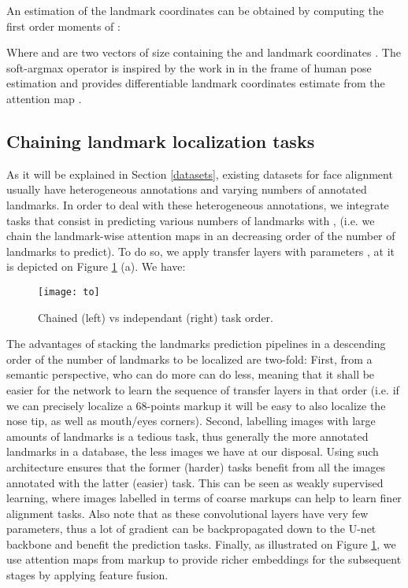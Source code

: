 \documentclass[10pt,twocolumn,letterpaper]{article}
\begin{document}
An estimation  of the landmark coordinates can be obtained by computing the first order moments of :



Where  and  are two vectors of size  containing the  and  landmark coordinates . The soft-argmax operator is inspired by the work in \cite{luvizon2017human} in the frame of human pose estimation and provides differentiable landmark coordinates estimate from the attention map .

\subsection{Chaining landmark localization tasks}\label{chainattmaps}

As it will be explained in Section \ref{datasets}, existing datasets for face alignment usually have heterogeneous annotations and varying numbers of annotated landmarks. In order to deal with these heterogeneous annotations, we integrate  tasks that consist in predicting various numbers of landmarks  with ,  (i.e. we chain the landmark-wise attention maps in an decreasing order of the number of landmarks to predict). To do so, we apply  transfer layers  with parameters , at it is depicted on Figure \ref{taskorder} (a). We have:

\begin{figure}[h!]
	\centering
	\texttt{[image: to]}
	\caption{Chained (left) vs independant (right) task order.}
	\label{taskorder}
\end{figure}



The advantages of stacking the landmarks prediction pipelines in a descending order of the number of landmarks to be localized are two-fold:  First, from a semantic perspective, who can do more can do less, meaning that it shall be easier for the network to learn the sequence of transfer layers in that order (i.e. if we can precisely localize a 68-points markup it will be easy to also localize the nose tip, as well as mouth/eyes corners). Second, labelling images with large amounts of landmarks is a tedious task, thus generally the more annotated landmarks in a database, the less images we have at our disposal. Using such architecture ensures that the former (harder) tasks benefit from all the images annotated with the latter (easier) task. This can be seen as weakly supervised learning, where images labelled in terms of coarse markups can help to learn finer alignment tasks. Also note that as these  convolutional layers have very few parameters, thus a lot of gradient can be backpropagated down to the U-net backbone and benefit the  prediction tasks. Finally, as illustrated on Figure \ref{taskorder}, we use attention maps  from markup  to provide richer embeddings for the subsequent stages by applying feature fusion.
\end{document}
